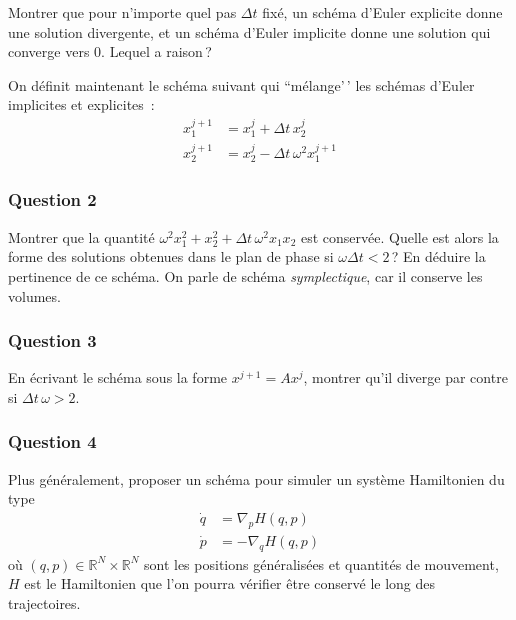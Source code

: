 
Montrer que pour n'importe quel pas \({\Delta t}\) fixé, un schéma
d'Euler explicite donne une solution divergente, et un schéma d'Euler
implicite donne une solution qui converge vers 0. Lequel a raison\,?

On définit maintenant le schéma suivant qui ``mélange'\,' les schémas
d'Euler implicites et explicites~: \begin{align*}
x^{j+1}_1 &= x^{j}_1 + {\Delta t}\, x^{j}_2 \\
x^{j+1}_2 &= x^{j}_2 - {\Delta t}\, \omega^2 x^{j+1}_1
\end{align*}

\hypertarget{ed2-symp-2}{%
\subsubsection*{Question 2}\label{ed2-symp-2}}


Montrer que la quantité
\(\omega^2 x_1^2 + x_2^2 +{\Delta t}\, \omega^2 x_1x_2\) est conservée.
Quelle est alors la forme des solutions obtenues dans le plan de phase
si \(\omega {\Delta t}<2\)\,? En déduire la pertinence de ce schéma. On
parle de schéma \emph{symplectique}, car il conserve les volumes.

\hypertarget{ed2-symp-3}{%
\subsubsection*{Question 3}\label{ed2-symp-3}}


En écrivant le schéma sous la forme \(x^{j+1}=Ax^j\), montrer qu'il
diverge par contre si \({\Delta t}\, \omega > 2\).

\hypertarget{ed2-symp-4}{%
\subsubsection*{Question 4}\label{ed2-symp-4}}


Plus généralement, proposer un schéma pour simuler un système
Hamiltonien du type \begin{align*}
\dot{q} &= \nabla_p H(q,p) \\
\dot{p} &= - \nabla_q H(q,p)
\end{align*} où \((q,p)\in \mathbb{R}^N \times \mathbb{R}^N\) sont les
positions généralisées et quantités de mouvement, \(H\) est le
Hamiltonien que l'on pourra vérifier être conservé le long des
trajectoires.

